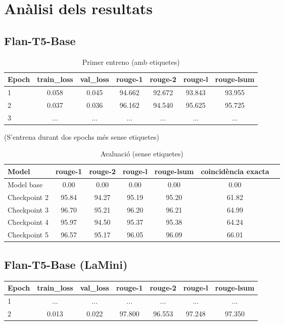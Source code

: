 \section{Anàlisi dels resultats}

\subsection{Flan-T5-Base}
\begin{table}[H]
    \caption{Primer entreno (amb etiquetes)}
    \begin{tabular}{lcccccc}
    \toprule
    Epoch & train\_loss & val\_loss & rouge-1 & rouge-2 & rouge-l & rouge-lsum \\
    \midrule
    1 & 0.058 & 0.045 & 94.662 & 92.672 & 93.843 & 93.955 \\
    2 & 0.037 & 0.036 & 96.162 & 94.540 & 95.625 & 95.725 \\
    3 & ... & ... & ... & ... & ... & ... \\
    \bottomrule
    \end{tabular}
\end{table}

(S'entrena durant dos epochs més sense etiquetes)

\begin{table}[H]
    \caption{Avaluació (sense etiquetes)}
    \begin{tabular}{lcccccc}
    \toprule
    Model & rouge-1 & rouge-2 & rouge-l & rouge-lsum & coincidència exacta \\
    \midrule
    Model base & 0.00 & 0.00 & 0.00 & 0.00 & 0.00 \\
    Checkpoint 2 & 95.84 & 94.27 & 95.19 & 95.20 & 61.82 \\
    Checkpoint 3 & 96.70 & 95.21 & 96.20 & 96.21 & 64.99 \\
    Checkpoint 4 & 95.97 & 94.50 & 95.37 & 95.38 & 64.24 \\
    Checkpoint 5 & 96.57 & 95.17 & 96.05 & 96.09 & 66.01 \\
    \bottomrule
    \end{tabular}
\end{table}







\subsection{Flan-T5-Base (LaMini)}
\begin{table}[H]
    \begin{tabular}{lcccccc}
    \toprule
    Epoch & train\_loss & val\_loss & rouge-1 & rouge-2 & rouge-l & rouge-lsum \\
    \midrule
    1 & ...   & ...   & ...    & ...    & ...    & ... \\
    2 & 0.013 & 0.022 & 97.800 & 96.553 & 97.248 & 97.350 \\
    \bottomrule
    \end{tabular}
\end{table}

